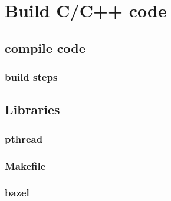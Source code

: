 \chapter{Build C/C++ code}

\section{compile code} 

\subsection{build steps} 

\section{Libraries} 

\subsection{pthread} 

\subsection{Makefile} 

\subsection{bazel} 

